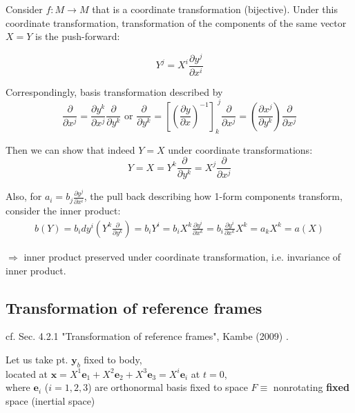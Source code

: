 Consider $f: M \to M$ that is a coordinate transformation (bijective). Under this coordinate transformation, transformation of the components of the same vector $X = Y$ is the push-forward:

\begin{equation}
	Y^j = X^i \frac{\partial y^j}{\partial x^i}
\end{equation}

Correspondingly, basis transformation described by 
\begin{equation}
	\frac{\partial }{ \partial x^j }= \frac{\partial y^k }{ \partial x^j} \frac{ \partial }{ \partial y^k}  \text{ or  } \frac{\partial }{\partial y^k} = \left[  \left( \frac{\partial y}{ \partial x} \right)^{-1} \right]_k^{\, \, j} \frac{ \partial }{ \partial x^j } = \left( \frac{ \partial x^j}{ \partial y^k} \right) \frac{ \partial }{ \partial x^j}
\end{equation} 

Then we can show that indeed $Y = X$ under coordinate transformations:
\begin{equation}
	Y = X = Y^k \frac{\partial }{\partial y^k} = X^j \frac{ \partial }{ \partial x^j}
\end{equation}

Also, for $a_i = b_j \frac{ \partial y^j}{\partial x^i}$, the pull back describing how 1-form components transform, consider the inner product:
\begin{equation}
\begin{gathered}
	b(Y) = b_i dy^i \left( Y^k \frac{\partial }{ \partial y^k} \right) = b_i Y^i = b_i X^k \frac{\partial y^i}{\partial x^k} = b_i \frac{\partial y^i }{\partial x^k} X^k = a_k X^k = a(X)
\end{gathered}
\end{equation}

$\Longrightarrow$ inner product preserved under coordinate transformation, i.e. invariance of inner product.





\subsection{Transformation of reference frames}

cf. Sec. 4.2.1 "Transformation of reference frames", Kambe (2009) \cite{dgdt:TKambe2009}.

Let us take pt. $\mathbf{y}_b$ fixed to body, \\
located at $\mathbf{x} = X^1 \mathbf{e}_1 + X^2 \mathbf{e}_2 + X^3 \mathbf{e}_3 = X^i \mathbf{e}_i$ at $t=0$, \\
where $\mathbf{e}_i$ ($i=1,2,3$) are orthonormal basis fixed to space $F \equiv$ nonrotating \textbf{fixed} space (inertial space) \\

